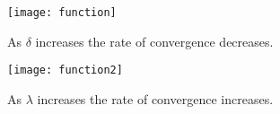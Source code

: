 \documentclass[10pt]{article}
\begin{document}
\clearpage

 \begin{figure}
 \begin{center}
    \texttt{[image: function]}
  \end{center}
  \caption{As $\delta$ increases the rate of convergence decreases.
  \label{fig:func_and_deriv}}
\end{figure}

 \begin{figure}
 \begin{center}
    \texttt{[image: function2]}
  \end{center}
  \caption{As $\lambda$ increases the rate of convergence increases.
  \label{fig:func2}}
\end{figure}
\end{document}
